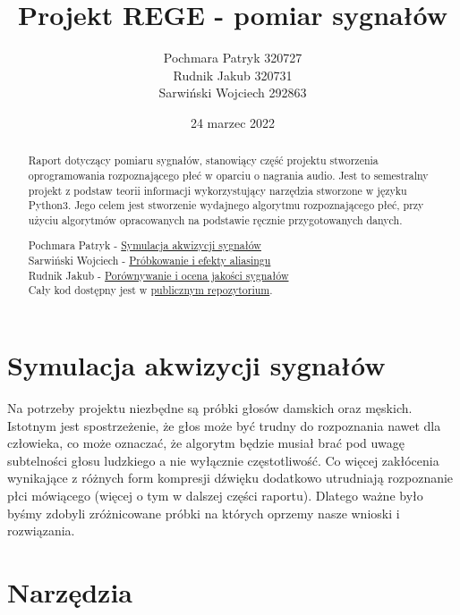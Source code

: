 \documentclass[a4paper,12pt]{extarticle}
\title{Projekt REGE - pomiar sygnałów}
\author{Pochmara Patryk 320727\\Rudnik Jakub 320731\\Sarwiński Wojciech 292863}
\date{24 marzec 2022}
\begin{document}
\maketitle

\begin{abstract}
Raport dotyczący pomiaru sygnałów, stanowiący część projektu stworzenia oprogramowania rozpoznającego płeć w oparciu o nagrania audio. Jest to semestralny projekt z podstaw teorii informacji wykorzystujący narzędzia stworzone w języku Python3. Jego celem jest stworzenie wydajnego algorytmu rozpoznającego płeć, przy użyciu algorytmów opracowanych na podstawie ręcznie przygotowanych danych.
\end{abstract}

\renewcommand{\abstractname}{Podział pracy}
\begin{abstract}
\noindent
Pochmara Patryk - \hyperref[sec:akwizycja]{Symulacja akwizycji sygnałów}\\
Sarwiński Wojciech - \hyperref[sec:aliasing]{Próbkowanie i efekty aliasingu}\\
Rudnik Jakub - \hyperref[sec:jakosc]{Porównywanie i ocena jakości sygnałów}\\
Cały kod dostępny jest w \href{https://github.com/zeraye/rege}{publicznym repozytorium}.
\end{abstract}

\newpage

\tableofcontents

\newpage

\section{Symulacja akwizycji sygnałów}
\label{sec:akwizycja}

Na potrzeby projektu niezbędne są próbki głosów damskich oraz męskich. Istotnym jest spostrzeżenie, że głos może być trudny do rozpoznania nawet dla człowieka, co może oznaczać, że algorytm będzie musiał brać pod uwagę subtelności głosu ludzkiego a nie wyłącznie częstotliwość. Co więcej zakłócenia wynikające z różnych form kompresji dźwięku dodatkowo utrudniają rozpoznanie płci mówiącego (więcej o tym w dalszej części raportu). Dlatego ważne było byśmy zdobyli zróżnicowane próbki na których oprzemy nasze wnioski i rozwiązania.

\newpage
    
\section*{Narzędzia}
\end{document}
